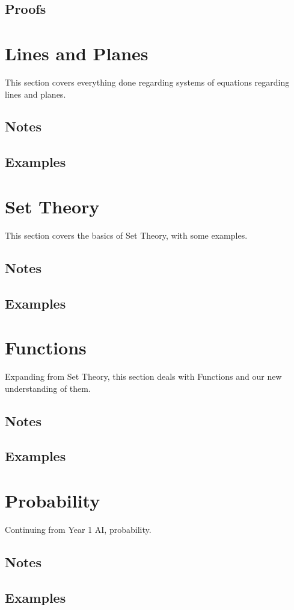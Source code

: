 \subsection{Proofs}
\newpage
\section{Lines and Planes}
This section covers everything done regarding systems of equations regarding lines and planes.
\subsection{Notes}
\subsection{Examples}
\newpage
\section{Set Theory}
This section covers the basics of Set Theory, with some examples.
\subsection{Notes}
\subsection{Examples}
\newpage
\section{Functions}
Expanding from Set Theory, this section deals with Functions and our new understanding of them.
\subsection{Notes}
\subsection{Examples}
\newpage
\section{Probability}
Continuing from Year 1 AI, probability.
\subsection{Notes}
\subsection{Examples}
\newpage
